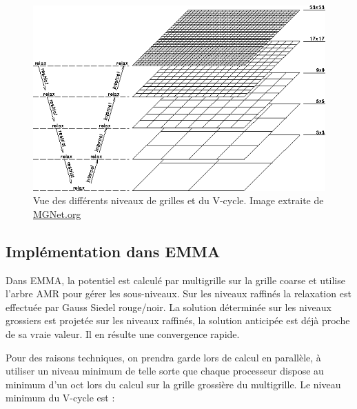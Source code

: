 \begin{figure}
\begin{center}
\includegraphics[scale=0.35]{img/02/multigrid.png}
\caption{Vue des différents niveaux de grilles et du V-cycle.
 Image extraite de \href{http://MGNet.org}{MGNet.org} }
\label{fig:mgrid}
\end{center}
\end{figure}	


\subsection{Implémentation dans EMMA}
Dans EMMA, la potentiel est calculé par multigrille sur la grille coarse et utilise l'arbre \ac{AMR} pour gérer les sous-niveaux.
Sur les niveaux raffinés la relaxation est effectuée par Gauss Siedel rouge/noir.
La solution déterminée sur les niveaux grossiers est projetée sur les niveaux raffinés, la solution anticipée est déjà proche de sa vraie valeur. 
Il en résulte une convergence rapide.

Pour des raisons techniques, on prendra garde lors de calcul en parallèle, à utiliser un niveau minimum de telle sorte que chaque processeur dispose au minimum d'un oct lors du calcul sur la grille grossière du multigrille.
Le niveau minimum du V-cycle est : 

